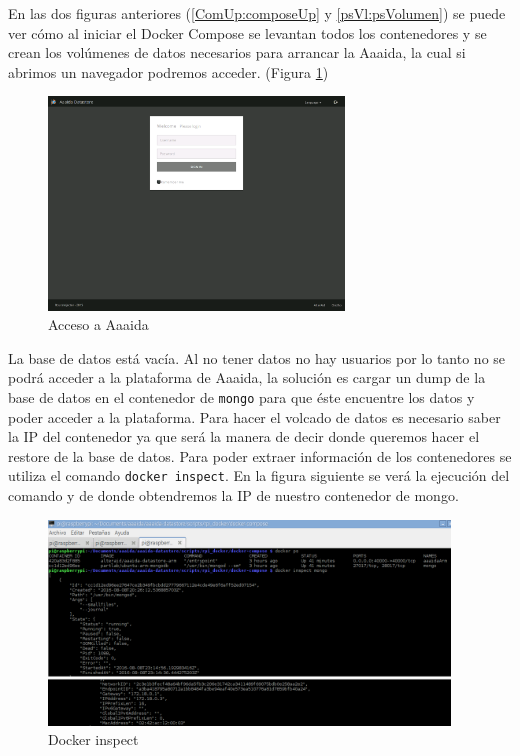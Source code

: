 En las dos figuras anteriores (\ref{ComUp:composeUp} y \ref{psVl:psVolumen}) se puede ver cómo al iniciar el Docker Compose se levantan todos los contenedores y se crean los volúmenes de datos necesarios para arrancar la Aaaida, la cual si abrimos un navegador podremos acceder. (Figura \ref{webLog:LoggeoAaaida}) 

\begin{figure}[htb]
\begin{center}
\includegraphics[width=0.70\textwidth]{./setup/AaaidaDatastore}
\caption{Acceso a Aaaida}
\label{webLog:LoggeoAaaida}
\end{center}
\end{figure} 

La base de datos está vacía. Al no tener datos no hay usuarios por lo tanto  no se podrá acceder a la plataforma de Aaaida, la solución es cargar un dump de la base de datos en el contenedor de \texttt{mongo} para que éste encuentre los datos y poder acceder a la plataforma.  Para hacer el volcado de datos es necesario saber la IP del contenedor ya que será la manera de decir donde queremos hacer el restore de la base de datos. Para poder extraer información de los contenedores se utiliza el comando \texttt{docker inspect}. En la figura siguiente se verá la ejecución del comando y de donde obtendremos la IP de nuestro contenedor de mongo.
\pagebreak

\begin{figure}[htb]
\begin{center}
\includegraphics[width=0.95\textwidth]{./setup/dockerinspect}
\caption{Docker inspect}
\label{insp:dockerInspect}
\end{center}
\end{figure} 

